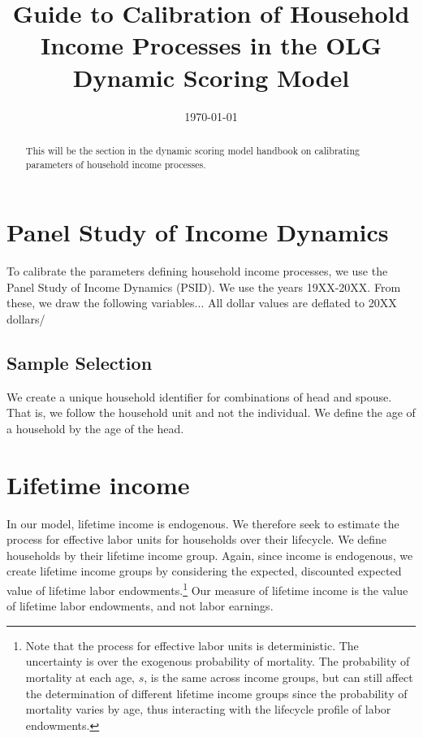 \documentclass[article,11pt,letterpaper,fleqn]{article}
\title{Guide to Calibration of Household Income Processes in the OLG Dynamic Scoring Model}
\date{\today}
\theoremstyle{definition}
\numberwithin{equation}{section}
\begin{document}

\maketitle



\begin{abstract}
This will be the section in the dynamic scoring model handbook on calibrating parameters of household income processes.
\end{abstract}

\section{Panel Study of Income Dynamics}

To calibrate the parameters defining household income processes, we use the Panel Study of Income Dynamics (PSID).  We use the years 19XX-20XX.  From these, we draw the following variables...  All dollar values are deflated to 20XX dollars/ 

\subsection{Sample Selection}

We create a unique household identifier for combinations of head and spouse.  That is, we follow the household unit and not the individual.  We define the age of a household by the age of the head.

\section{Lifetime income}

In our model, lifetime income is endogenous.  We therefore seek to estimate the process for effective labor units for households over their lifecycle.  We define households by their lifetime income group.  Again, since income is endogenous, we create lifetime income groups by considering the expected, discounted expected value of lifetime labor endowments.\footnote{Note that the process for effective labor units is deterministic.  The uncertainty is over the exogenous probability of mortality.  The probability of mortality at each age, $s$, is the same across income groups, but can still affect the determination of different lifetime income groups since the probability of mortality varies by age, thus interacting with the lifecycle profile of labor endowments.} Our measure of lifetime income is the value of lifetime labor endowments, and not labor earnings.
\end{document}
